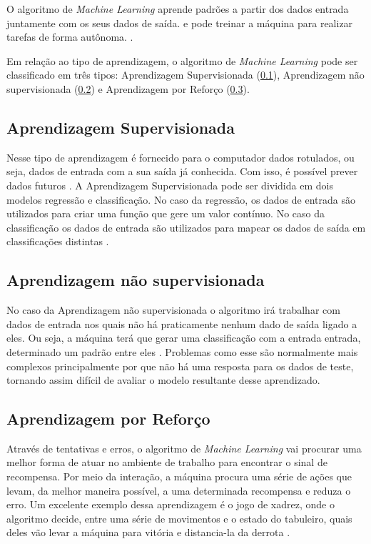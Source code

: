 O algoritmo de \textit{Machine Learning} aprende padrões a partir dos dados entrada juntamente com os seus dados de saída. e pode treinar a máquina para realizar tarefas de forma autônoma. \cite{diferencamachinelearning}.

Em relação ao tipo de aprendizagem, o algoritmo de \textit{Machine Learning} pode ser classificado em três tipos: Aprendizagem Supervisionada (\ref{aprendizadagem supervisionada}), Aprendizagem não supervisionada (\ref{Aprendizagem não supervisionada}) e Aprendizagem por Reforço (\ref{Aprendizagem por Reforço}).

\subsection{Aprendizagem Supervisionada}
\label{aprendizadagem supervisionada}
Nesse tipo de aprendizagem é fornecido para o computador dados rotulados, ou seja, dados de entrada com a sua saída já conhecida. Com isso, é possível prever dados futuros \cite{pythonmachinelearning}. 
A Aprendizagem Supervisionada pode ser dividida em dois modelos regressão e classificação. No caso da regressão, os dados de entrada são utilizados para criar uma função que gere um valor contínuo. No caso da classificação os dados de entrada são utilizados para mapear os dados de saída em classificações distintas \cite{pythonmachinelearning}. 

\subsection{Aprendizagem não supervisionada}
\label{Aprendizagem não supervisionada}
No caso da Aprendizagem não supervisionada o algoritmo irá trabalhar com dados de entrada nos quais não há praticamente nenhum dado de saída ligado a eles. Ou seja, a máquina terá que gerar uma classificação com a entrada entrada, determinado um padrão entre eles \cite{pythonmachinelearning}. Problemas como esse são normalmente mais complexos principalmente por que não há uma resposta para os dados de teste, tornando assim difícil de avaliar o modelo resultante desse aprendizado.

\subsection{Aprendizagem por Reforço}
\label{Aprendizagem por Reforço}
Através de tentativas e erros, o algoritmo de \textit{Machine Learning} vai procurar uma melhor forma de atuar no ambiente de trabalho para encontrar o sinal de recompensa. Por meio da interação, a máquina procura uma série de ações que levam, da melhor maneira possível, a uma determinada recompensa e reduza o erro. Um excelente exemplo dessa aprendizagem é o jogo de xadrez, onde o algoritmo decide, entre uma série de movimentos e o estado do tabuleiro, quais deles vão levar a máquina para vitória e distancia-la da derrota \cite{pythonmachinelearning}.


